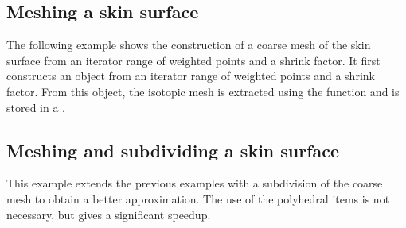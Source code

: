 \subsection{Meshing a skin surface}
The following example shows the construction of a coarse mesh of the
skin surface from an iterator range of weighted points and a shrink
factor. It first constructs an  object from an
iterator range of weighted points and a shrink factor. From this
object, the isotopic mesh is extracted using the function
 and is stored in a .

\subsection{Meshing and subdividing a skin surface}
This example extends the previous examples with a subdivision of the
coarse mesh to obtain a better approximation. The use of the
polyhedral items is not necessary, but gives a significant speedup.



